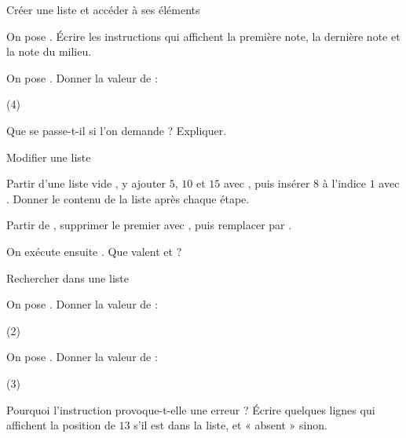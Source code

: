 \exercices
{}

\begin{exercice}[1]{Créer une liste et accéder à ses éléments}
\begin{questions}
  \item On pose . Écrire les instructions qui affichent la première note, la dernière note et la
    note du milieu.
  \item On pose . Donner la valeur de :
\begin{tasks}[label=\alph*)](4)
  \task {}
  \task {}
  \task {}
  \task {}
\end{tasks}
  \item Que se passe-t-il si l'on demande  ? Expliquer.
\end{questions}
\end{exercice}

\begin{exercice}[1]{Modifier une liste}
\begin{questions}
  \item Partir d'une liste vide , y ajouter $5$, $10$ et $15$ avec , puis insérer $8$ à l'indice $1$
    avec . Donner le contenu de la liste après chaque étape.
  \item Partir de , supprimer le premier  avec , puis
    remplacer  par .
  \item On exécute ensuite . Que valent  et  ?
\end{questions}
\end{exercice}

\begin{exercice}[1]{Rechercher dans une liste}
\begin{questions}
  \item On pose . Donner la valeur de :
\begin{tasks}[label=\alph*)](2)
  \task {}
  \task {}
  \task {}
  \task {}
\end{tasks}
  \item On pose . Donner la valeur de :
\begin{tasks}[label=\alph*)](3)
  \task {}
  \task {}
  \task {}
\end{tasks}
  \item Pourquoi l'instruction  provoque-t-elle une erreur ? Écrire quelques lignes qui affichent la position de
    $13$ s'il est dans la liste, et « absent » sinon.
\end{questions}
\end{exercice}

